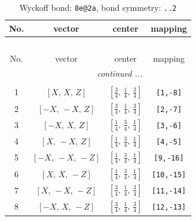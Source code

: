 \documentclass[fleqn,8pt]{jsarticle}
\begin{document}
\begin{longtable}{cccc}
\caption{Wyckoff bond: {\tt 8e@2a}, bond symmetry: {\tt ..2}}
 \\
 \hline \hline
No. & vector & center & mapping \\ \hline \endfirsthead

\multicolumn{3}{l}{\tablename\ \thetable{}} \\
 \hline \hline
No. & vector & center & mapping \\ \hline \endhead

 \hline \hline
\multicolumn{3}{r}{\footnotesize\it continued ...} \\ \endfoot

 \hline \hline
\multicolumn{3}{r}{} \\ \endlastfoot

1 & $\left[ X,\, X,\, Z \right]$ & $\left[ \frac{3}{4},\, \frac{1}{4},\, \frac{3}{4} \right]$ & {\tt [1,-8]} \\ \hline
2 & $\left[ - X,\, - X,\, Z \right]$ & $\left[ \frac{3}{4},\, \frac{1}{4},\, \frac{3}{4} \right]$ & {\tt [2,-7]} \\ \hline
3 & $\left[ - X,\, X,\, Z \right]$ & $\left[ \frac{1}{4},\, \frac{3}{4},\, \frac{1}{4} \right]$ & {\tt [3,-6]} \\ \hline
4 & $\left[ X,\, - X,\, Z \right]$ & $\left[ \frac{1}{4},\, \frac{3}{4},\, \frac{1}{4} \right]$ & {\tt [4,-5]} \\ \hline
5 & $\left[ - X,\, - X,\, - Z \right]$ & $\left[ \frac{1}{4},\, \frac{3}{4},\, \frac{1}{4} \right]$ & {\tt [9,-16]} \\ \hline
6 & $\left[ X,\, X,\, - Z \right]$ & $\left[ \frac{1}{4},\, \frac{3}{4},\, \frac{1}{4} \right]$ & {\tt [10,-15]} \\ \hline
7 & $\left[ X,\, - X,\, - Z \right]$ & $\left[ \frac{3}{4},\, \frac{1}{4},\, \frac{3}{4} \right]$ & {\tt [11,-14]} \\ \hline
8 & $\left[ - X,\, X,\, - Z \right]$ & $\left[ \frac{3}{4},\, \frac{1}{4},\, \frac{3}{4} \right]$ & {\tt [12,-13]} \\
\end{longtable}
\renewcommand{\arraystretch}{1.2}
\end{document}
